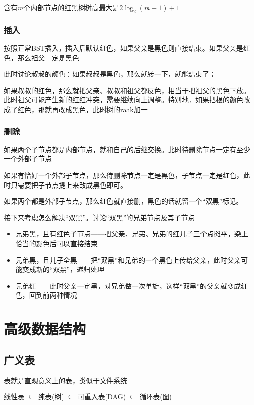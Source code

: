 \documentclass[8pt]{article}
\begin{document}
含有$m$个内部节点的红黑树树高最大是$2\log_2(m+1)+1$

\subsubsection{插入}
按照正常BST插入，插入后默认红色，如果父亲是黑色则直接结束。如果父亲是红色，那么祖父一定是黑色

此时讨论叔叔的颜色：如果叔叔是黑色，那么就转一下，就能结束了；

如果叔叔的红色，那么就把父亲、叔叔和祖父都反色，相当于把祖父的黑色下放。此时祖父可能产生新的红红冲突，需要继续向上调整。特别地，如果把根的颜色改成了红色，那就再改成黑色，此时树的rank加一

\subsubsection{删除}

如果两个子节点都是内部节点，就和自己的后继交换。此时待删除节点一定有至少一个外部子节点

如果有恰好一个外部子节点，那么待删除节点一定是黑色，子节点一定是红色，此时只需要把子节点提上来改成黑色即可。

如果两个都是外部子节点，那么红色就直接删，黑色的话就留一个“双黑”标记。

接下来考虑怎么解决“双黑”。讨论“双黑”的兄弟节点及其子节点

\begin{itemize}
	\item 兄弟黑，且有红色子节点——把父亲、兄弟、兄弟的红儿子三个点摊平，染上恰当的颜色后可以直接结束
	\item 兄弟黑，且儿子全黑——把“双黑”和兄弟的一个黑色上传给父亲，此时父亲可能变成新的“双黑”，递归处理
	\item 兄弟红——此时父亲一定黑，对兄弟做一次单旋，这样“双黑”的父亲就变成红色，回到前两种情况
\end{itemize}

\section{高级数据结构}

\subsection{广义表}

表就是直观意义上的表，类似于文件系统

\begin{center}
	线性表 $\subseteq$ 纯表(树) $\subseteq$ 可重入表(DAG) $\subseteq$ 循环表(图)
\end{center}
\end{document}
